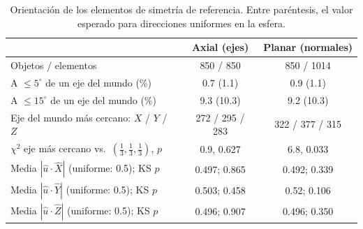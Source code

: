 \begin{table}[htbp]
\centering
\small
\caption{Orientación de los elementos de simetría de referencia. Entre paréntesis, el valor esperado para direcciones uniformes en la esfera.}
\label{tab:orientacion_gt}
\begin{tabular}{lcc}
\toprule
 & Axial (ejes) & Planar (normales) \\
\midrule
Objetos / elementos & 850 / 850 & 850 / 1014 \\
A $\leq 5^\circ$ de un eje del mundo (\%) & 0.7 (1.1) & 0.9 (1.1) \\
A $\leq 15^\circ$ de un eje del mundo (\%) & 9.3 (10.3) & 9.2 (10.3) \\
Eje del mundo más cercano: $X$ / $Y$ / $Z$ & 272 / 295 / 283 & 322 / 377 / 315 \\
$\chi^2$ eje más cercano vs.\ $(\tfrac13,\tfrac13,\tfrac13)$, $p$ & 0.9, 0.627 & 6.8, 0.033 \\
Media $|\hat{u}\cdot\hat{X}|$ (uniforme: 0.5); KS $p$ & 0.497; 0.865 & 0.492; 0.339 \\
Media $|\hat{u}\cdot\hat{Y}|$ (uniforme: 0.5); KS $p$ & 0.503; 0.458 & 0.52; 0.106 \\
Media $|\hat{u}\cdot\hat{Z}|$ (uniforme: 0.5); KS $p$ & 0.496; 0.907 & 0.496; 0.350 \\
\bottomrule
\end{tabular}
\end{table}
